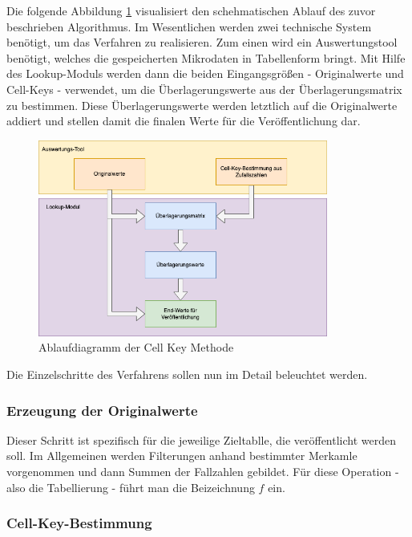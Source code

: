 Die folgende Abbildung \ref{fig_ckm_chart} visualisiert den schehmatischen Ablauf des zuvor beschrieben Algorithmus. Im Wesentlichen werden zwei technische System benötigt, um das Verfahren zu realisieren. Zum einen wird ein Auswertungstool benötigt, welches die gespeicherten Mikrodaten in Tabellenform bringt. Mit Hilfe des Lookup-Moduls werden dann die beiden Eingangsgrö\ss en - Originalwerte und Cell-Keys - verwendet, um die Überlagerungswerte aus der Überlagerungsmatrix zu bestimmen. Diese Überlagerungswerte werden letztlich auf die Originalwerte addiert und stellen damit die finalen Werte für die Veröffentlichung dar. 

\begin{figure}[H]
    \begin{center}
        \includegraphics[width=0.85\textwidth]{img/ckm_flow.png}
        \caption{Ablaufdiagramm der Cell Key Methode}
        \label{fig_ckm_chart}
    \end{center}
\end{figure}

Die Einzelschritte des Verfahrens sollen nun im Detail beleuchtet werden.

\subsubsection{Erzeugung der Originalwerte}

Dieser Schritt ist spezifisch für die jeweilige Zieltablle, die veröffentlicht werden soll. Im Allgemeinen werden Filterungen anhand bestimmter Merkamle vorgenommen und dann Summen der Fallzahlen gebildet. Für diese Operation - also die Tabellierung - führt man die Beizeichnung $f$ ein.

\subsubsection{Cell-Key-Bestimmung}

